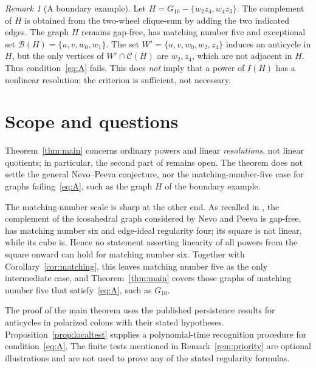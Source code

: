 \documentclass[11pt,a4paper]{article}
\theoremstyle{remark}\newtheorem{remark}[theorem]{Remark}
\newcommand{\Bad}{\mathcal B}
\newcommand{\Good}{\mathcal C}
\begin{document}
\begin{remark}[A boundary example]
Let $H=G_{10}-\{w_2z_4,w_4z_3\}$. The complement of $H$ is obtained from the two-wheel clique-sum by adding the two indicated edges. The graph $H$ remains gap-free, has matching number five and exceptional set $\Bad(H)=\{u,v,w_0,w_1\}$. The set $W'=\{u,v,w_0,w_2,z_4\}$ induces an anticycle in $H$, but the only vertices of $W'\cap\Good(H)$ are $w_2,z_4$, which are not adjacent in $H$. Thus condition~\eqref{eq:A} fails. This does \emph{not} imply that a power of $I(H)$ has a nonlinear resolution: the criterion is sufficient, not necessary.
\end{remark}

\section{Scope and questions}
Theorem~\ref{thm:main} concerns ordinary powers and linear \emph{resolutions}, not linear quotients; in particular, the second part of \cite[Question 5.1]{EHHKM} remains open. The theorem does not settle the general Nevo--Peeva conjecture, nor the matching-number-five case for graphs failing~\eqref{eq:A}, such as the graph $H$ of the boundary example.

The matching-number scale is sharp at the other end. As recalled in \cite[Section 5]{EHHKM}, the complement of the icosahedral graph considered by Nevo and Peeva \cite{NP} is gap-free, has matching number six and edge-ideal regularity four; its square is not linear, while its cube is. Hence no statement asserting linearity of all powers from the square onward can hold for matching number six. Together with Corollary~\ref{cor:matching}, this leaves matching number five as the only intermediate case, and Theorem~\ref{thm:main} covers those graphs of matching number five that satisfy~\eqref{eq:A}, such as $G_{10}$.

The proof of the main theorem uses the published persistence results for anticycles in polarized colons \cite{Banerjee} with their stated hypotheses. Proposition~\ref{prop:localtest} supplies a polynomial-time recognition procedure for condition~\eqref{eq:A}. The finite tests mentioned in Remark~\ref{rem:priority} are optional illustrations and are not used to prove any of the stated regularity formulas.
\end{document}
